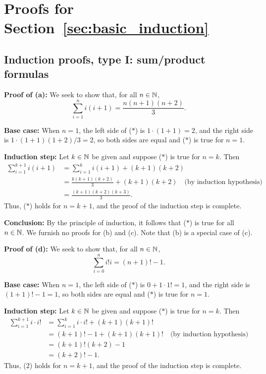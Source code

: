 \section{Proofs for Section~\ref{sec:basic_induction}}
\subsection{Induction proofs, type I: sum/product formulas}


\textbf{Proof of (a):}
We seek to show that, for all $n\in\mathbb{N}$,  
\[
\sum_{i=1}^n i(i+1)=\frac{n(n+1)(n+2)}{3}. 
\tag{$*$}
\]

\textbf{Base case:} When $n=1$, the left side of ($*$) is $1\cdot(1+1) =2$,
and the
right side is $1\cdot(1+1)(1+2)/3=2$, so both sides are equal and ($*$) is
true for $n=1$.

\textbf{Induction step:} Let $k\in\mathbb{N}$ be given and suppose 
($*$) is true for $n=k$. Then
\begin{align*}
\sum_{i=1}^{k+1}i(i+1)
&=
\sum_{i=1}^{k}i(i+1)
+(k+1)(k+2)
\\
&=\frac{k(k+1)(k+2)}{3} 
+(k+1)(k+2)
\quad \text{(by induction hypothesis)}
\\
&=\frac{(k+1)(k+2)(k+3)}{3}.
\end{align*}
Thus, ($*$) holds for $n=k+1$, and the proof of the induction step is complete. 

\textbf{Conclusion:} By the principle of induction,  it follows that
($*$) is true for all $n\in\mathbb{N}$.  
\medskip
We furnish no proofs for (b) and (c).  Note that (b) is a special case of (c).

\medskip


\textbf{Proof of (d):}
We seek to show that, for all $n\in\mathbb{N}$,
\[
\sum_{i=0}^n i! i
= (n+1)!-1. 
\tag{$*$}
\]

\textbf{Base case:} When $n=1$, the left side of ($*$) is $0+1 \cdot 1! =1$,
and the
right side is $(1+1)!-1=1$, so both sides are equal and ($*$) is
true for $n=1$.

\textbf{Induction step:} Let $k\in\mathbb{N}$ be given and suppose 
($*$) is true for $n=k$. Then
\begin{align*}
\sum_{i=1}^{k+1}i\cdot i!
&=
\sum_{i=1}^{k}i\cdot i! + (k+1)(k+1)!
\\
&= (k+1)!-1 + (k+1)(k+1)!
\quad \text{(by induction hypothesis)}
\\
&=(k+1)!(k+2)-1
\\
&=(k+2)!-1.
\end{align*}
Thus, (2) holds for $n=k+1$, and the proof of the induction step is complete. 

